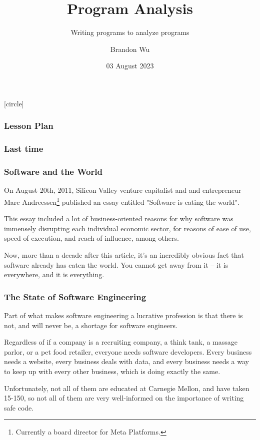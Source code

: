 \documentclass[aspectratio=169, handout]{beamer}
\title{Program Analysis} %
\subtitle{Writing programs to analyze programs} %
\date{03 August 2023} %
\author{Brandon Wu} %
\newif\ifcolorlambda
\begin{document}
\ifweb
    \renewcommand{\pause}{}
\fi

[circle]

{
\begin{frame}[plain]
    \colorlambdatrue
    \titlepage
\end{frame}
}

\begin{frame}[fragile]
  \frametitle{Lesson Plan}

  \tableofcontents
\end{frame}

\begin{frame}[fragile]
  \frametitle{Last time}
\end{frame}


\begin{frame}[fragile]
  \frametitle{Software and the World}

  On August 20th, 2011, Silicon Valley venture capitalist and and
  entrepreneur Marc Andreessen\footnote{Currently a board director for Meta Platforms.} published an essay entitled
  "Software is eating the world".

  \pause
  \vspace{\fill}

  This essay included a lot of business-oriented reasons for why software
  was immensely disrupting each individual economic sector, for reasons of
  ease of use, speed of execution, and reach of influence, among others.

  \pause
  \vspace{\fill}

  Now, more than a decade after this article, it's an incredibly obvious fact that
  software already has eaten the world. You cannot get away from it -- it is
  everywhere, and it is everything.
\end{frame}

\begin{frame}[fragile]
  \frametitle{The State of Software Engineering}

  Part of what makes software engineering a lucrative profession is that there
  is not, and will never be, a shortage for software engineers.

  \pause
  \vspace{\fill}

  Regardless of if a company is a recruiting company, a think tank, a massage parlor,
  or a pet food retailer, everyone needs software developers. Every business needs
  a website, every business deals with data, and every business needs a way to
  keep up with every other business, which is doing exactly the same.

  \pause
  \vspace{\fill}

  Unfortunately, not all of them are educated at Carnegie Mellon, and
  have taken 15-150, so not all of them are very well-informed on the
  importance of writing safe code.
\end{frame}
\end{document}
